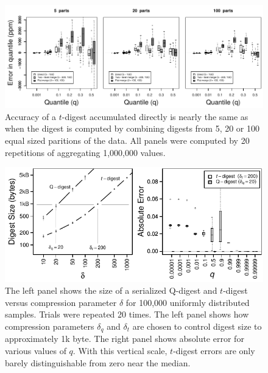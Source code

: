 \documentclass[]{statsoc}
\begin{document}
\begin{figure}[p] %
   \centering
   \includegraphics[width=5.5in]{merge.pdf} 
   \caption{Accuracy of a $t$-digest accumulated directly is nearly the same as when the digest is computed by combining digests from 5, 20 or 100 equal sized paritions of the data.  All panels were computed by 20 repetitions of aggregating 1,000,000 values. }
   \label{fig:merge}
\end{figure}
\begin{figure}[p] %
   \centering
   \includegraphics[width=4.5in]{qd-sizes.pdf} 
   \caption{The left panel shows the size of a serialized Q-digest and $t$-digest versus compression parameter $\delta$ for 100,000 uniformly distributed samples. Trials were repeated 20 times. The left panel shows how compression parameters $\delta_q$ and $\delta_t$ are chosen to control digest size to approximately 1k byte. The right panel shows absolute error for various values of $q$.  With this vertical scale, $t$-digest errors are only barely distinguishable from zero near the median.  }
   \label{fig:qd-comparison}
\end{figure}

{}
\end{document}
